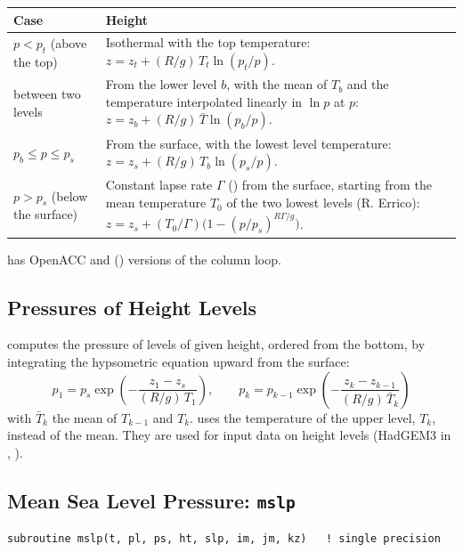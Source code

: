 \begin{longtable}{L{3.5cm} L{10.5cm}}
  \toprule
  \textbf{Case} & \textbf{Height} \\
  \midrule
  \endhead
  \bottomrule
  \endfoot
  $p < p_t$ (above the top) &
    Isothermal with the top temperature:
    $z = z_t + (R/g)\,T_t\ln(p_t/p)$. \\
  between two levels &
    From the lower level $b$, with the mean of $T_b$ and the temperature
    interpolated linearly in $\ln p$ at $p$:
    $z = z_b + (R/g)\,\bar T\ln(p_b/p)$. \\
  $p_b \le p \le p_s$ &
    From the surface, with the lowest level temperature:
    $z = z_s + (R/g)\,T_b\ln(p_s/p)$. \\
  $p > p_s$ (below the surface) &
    Constant lapse rate $\Gamma$ () from the surface, starting
    from the mean temperature $T_0$ of the two lowest levels (R. Errico):
    $z = z_s + (T_0/\Gamma)\bigl(1 - (p/p_s)^{R\Gamma/g}\bigr)$. \\
\end{longtable}

 has OpenACC and  ()
versions of the column loop.

\subsection{Pressures of Height Levels}
\label{subsec:hgt_psig}

 computes the pressure of levels
of given height, ordered from the bottom, by integrating the hypsometric
equation upward from the surface:
\[
  p_1 = p_s \exp\!\left(-\frac{z_1 - z_s}{(R/g)\,T_1}\right), \qquad
  p_k = p_{k-1}\exp\!\left(-\frac{z_k - z_{k-1}}{(R/g)\,\bar T_k}\right)
\]
with $\bar T_k$ the mean of $T_{k-1}$ and $T_k$.  uses the
temperature of the upper level, $T_k$, instead of the mean. They are used
for input data on height levels (HadGEM3 in ,
).

\subsection{Mean Sea Level Pressure: \texttt{mslp}}
\label{subsec:hgt_mslp}

\begin{lstlisting}
subroutine mslp(t, pl, ps, ht, slp, im, jm, kz)   ! single precision
\end{lstlisting}

